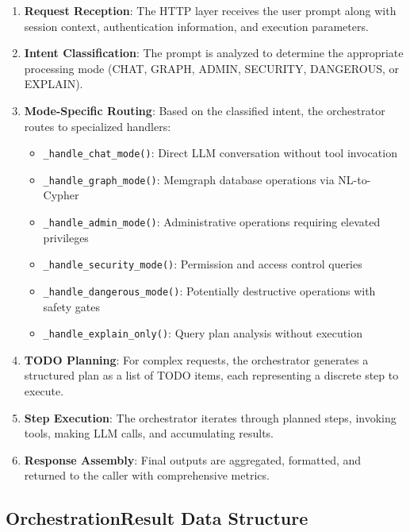 \begin{enumerate}
    \item \textbf{Request Reception}: The HTTP layer receives the user prompt along with session context, authentication information, and execution parameters.
    
    \item \textbf{Intent Classification}: The prompt is analyzed to determine the appropriate processing mode (CHAT, GRAPH, ADMIN, SECURITY, DANGEROUS, or EXPLAIN).
    
    \item \textbf{Mode-Specific Routing}: Based on the classified intent, the orchestrator routes to specialized handlers:
    \begin{itemize}
        \item \texttt{\_handle\_chat\_mode()}: Direct LLM conversation without tool invocation
        \item \texttt{\_handle\_graph\_mode()}: Memgraph database operations via NL-to-Cypher
        \item \texttt{\_handle\_admin\_mode()}: Administrative operations requiring elevated privileges
        \item \texttt{\_handle\_security\_mode()}: Permission and access control queries
        \item \texttt{\_handle\_dangerous\_mode()}: Potentially destructive operations with safety gates
        \item \texttt{\_handle\_explain\_only()}: Query plan analysis without execution
    \end{itemize}
    
    \item \textbf{TODO Planning}: For complex requests, the orchestrator generates a structured plan as a list of TODO items, each representing a discrete step to execute.
    
    \item \textbf{Step Execution}: The orchestrator iterates through planned steps, invoking tools, making LLM calls, and accumulating results.
    
    \item \textbf{Response Assembly}: Final outputs are aggregated, formatted, and returned to the caller with comprehensive metrics.
\end{enumerate}

\subsection{OrchestrationResult Data Structure}

